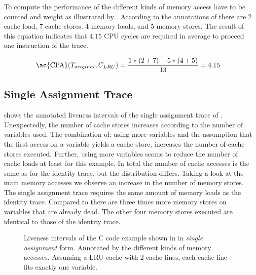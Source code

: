 \documentclass[onecolumn, openright, master, english, signatures]{dbrgrptt}
\begin{document}
To compute the performance of  the different kinds of memory access have to be counted and weight as illustrated by .
According to the annotations of  there are 2 cache load, 7 cache stores, 4 memory loads, and 5 memory stores.
The result of this equation indicates that $4.15$ \ac{CPU} cycles are required in average to proceed one instruction of the \ac{trace}.

\begin{equation}\label{equ:trace-transformation-original-marked}
\text{\ac{CPA}}(T_{original}, C_{LRU}) = \frac{1 * (2 + 7) + 5 * (4 + 5)}{13} = 4.15
\end{equation}

\subsection{Single Assignment Trace}
 shows the annotated liveness intervals of the single assignment trace of .
Unexpectedly, the number of cache stores increases according to the number of variables used.
The combination of: using more variables and the assumption that the first access on a variable yields a cache store, increases the number of cache stores executed.
Further, using more variables seams to reduce the number of cache loads at least for this example.
In total the number of cache accesses is the same as for the identity \ac{trace}, but the distribution differs.
Taking a look at the main memory accesses we observe an increase in the number of memory stores.
The single assignment \ac{trace} requires the same amount of memory loads as the identity \ac{trace}.
Compared to  there are three times more memory stores on variables that are already dead.
The other four memory stores executed are identical to those of the identity \ac{trace}.

\begin{figure}
  \centering
  
  \caption{Liveness intervals of the C code example shown in  in \emph{single assignment} form. Annotated by the different kinds of memory accesses. Assuming a \ac{LRU} cache with 2 cache lines, each cache line fits exactly one variable.}
  \label{fig:trace-transformation-sa-marked}
\end{figure}
\end{document}
